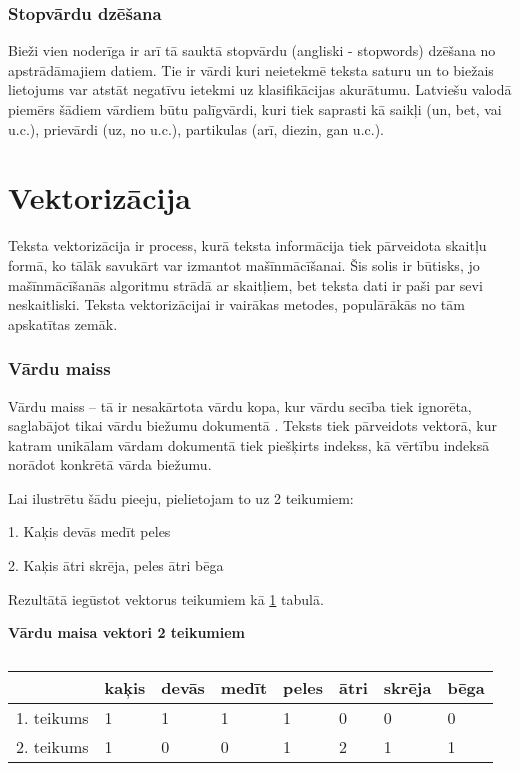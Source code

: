 \subsubsection{Stopvārdu dzēšana}
Bieži vien noderīga ir arī tā sauktā stopvārdu (angliski - stopwords) dzēšana no apstrādāmajiem datiem. Tie ir vārdi kuri neietekmē teksta saturu un to biežais lietojums var atstāt negatīvu ietekmi uz klasifikācijas akurātumu. Latviešu valodā piemērs šādiem vārdiem būtu palīgvārdi, kuri tiek saprasti kā saikļi (un, bet, vai u.c.), prievārdi (uz, no u.c.), partikulas (arī, diezin, gan u.c.).

\section{Vektorizācija}
Teksta vektorizācija ir process, kurā teksta informācija tiek pārveidota skaitļu formā, ko tālāk savukārt var izmantot mašīnmācīšanai. Šis solis ir būtisks, jo mašīnmācīšanās algoritmu strādā ar skaitļiem, bet teksta dati ir paši par sevi neskaitliski. Teksta vektorizācijai ir vairākas metodes, populārākās no tām apskatītas zemāk.

\subsubsection{Vārdu maiss}
Vārdu maiss – tā ir nesakārtota vārdu kopa, kur vārdu secība tiek ignorēta, saglabājot tikai vārdu biežumu dokumentā \cite{speechandlanguageproc}. Teksts tiek pārveidots vektorā, kur katram unikālam vārdam dokumentā tiek piešķirts indekss, kā vērtību indeksā norādot konkrētā vārda biežumu. 

Lai ilustrētu šādu pieeju, pielietojam to uz 2 teikumiem:

1. Kaķis devās medīt peles

2. Kaķis ātri skrēja, peles ātri bēga

Rezultātā iegūstot vektorus teikumiem kā \ref{tab:vardu_maiss} tabulā.
\begin{table}[H]
\centering
\caption{\label{tab:vardu_maiss}}
\textbf{Vārdu maisa vektori 2 teikumiem\\}
\begin{tabular}{|l|l|l|l|l|l|l|l|}
\hline
           & kaķis & devās & medīt & peles & ātri & skrēja & bēga \\ \hline
1. teikums & 1     & 1     & 1     & 1     & 0    & 0      & 0    \\ \hline
2. teikums & 1     & 0     & 0     & 1     & 2    & 1      & 1    \\ \hline
\end{tabular}
\end{table}

